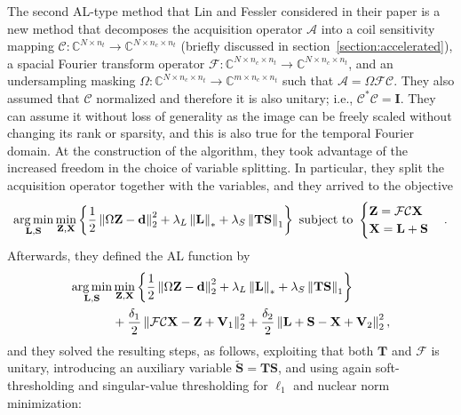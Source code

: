 The second AL-type method that Lin and Fessler considered in their paper is a new method that decomposes the acquisition operator $\mathcal{A}$ into a coil sensitivity mapping $\mathcal{C}:\mathbb{C}^{N \times n_t} \rightarrow \mathbb{C}^{N \times n_c \times n_t}$ (briefly discussed in section~\ref{section:accelerated}), a spacial Fourier transform operator $\mathcal{F}: \mathbb{C}^{N \times n_c \times n_t} \rightarrow \mathbb{C}^{N \times n_c \times n_t}$, and an undersampling masking $\Omega: \mathbb{C}^{N \times n_c \times n_t} \rightarrow \mathbb{C}^{m \times n_c \times n_t}$ such that $\mathcal{A} = \Omega\mathcal{FC}$. They also assumed that $\mathcal{C}$ normalized and therefore it is also unitary; i.e., $\mathcal{C}^*\mathcal{C} = \mathbf{I}$. They can assume it without loss of generality as the image can be freely scaled without changing its rank or sparsity, and this is also true for the temporal Fourier domain. At the construction of the algorithm, they took advantage of the increased freedom in the choice of variable splitting. In particular, they split the acquisition operator together with the variables, and they arrived to the objective
\[\operatorname*{arg\,min}_{\mathbf{L,S}}\min_{\mathbf{Z,X}}\left\{\frac{1}{2}\left\lVert\Omega \mathbf{Z -d}\right\rVert_2^2 + \lambda_L \left\lVert\mathbf{L}\right\rVert_* + \lambda_S \left\lVert\mathbf{TS}\right\rVert_1\right\} \text{ subject to } \begin{cases} \mathbf{Z} = \mathcal{FC}\mathbf{X} \\ \mathbf{X = L + S} \end{cases}.\]
Afterwards, they defined the AL function by
\begin{align*}
    \operatorname*{arg\,min}_{\mathbf{L,S}}&\min_{\mathbf{Z,X}}\left\{\frac{1}{2}\left\lVert\Omega \mathbf{Z -d}\right\rVert_2^2 + \lambda_L \left\lVert\mathbf{L}\right\rVert_* + \lambda_S \left\lVert\mathbf{TS}\right\rVert_1\right\}\\
    & + \frac{\delta_1}{2}\left\lVert\mathcal{FC}\mathbf{X - Z + V}_1\right\rVert_2^2 + \frac{\delta_2}{2}\left\lVert\mathbf{L + S - X + V}_2\right\rVert_2^2,
\end{align*}
and they solved the resulting steps, as follows, exploiting that both $\mathbf{T}$ and $\mathcal{F}$ is unitary, introducing an auxiliary variable $\mathbf{\tilde{S}} = \mathbf{TS}$, and using again soft-thresholding and singular-value thresholding for $\ell_1$ and nuclear norm minimization:

